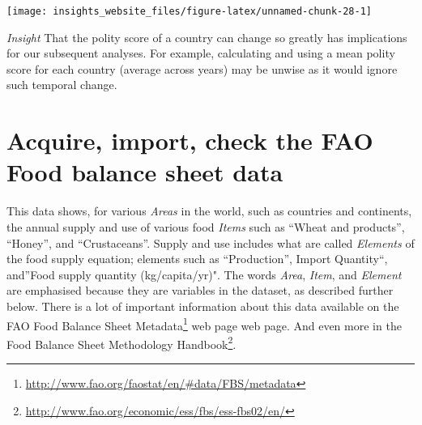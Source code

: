 \documentclass[]{book}
\newenvironment{Shaded}{\begin{snugshade}}{\end{snugshade}}
\newcommand{\DataTypeTok}[1]{\textcolor[rgb]{0.13,0.29,0.53}{#1}}
\newcommand{\KeywordTok}[1]{\textcolor[rgb]{0.13,0.29,0.53}{\textbf{#1}}}
\newcommand{\NormalTok}[1]{#1}
\newcommand{\OperatorTok}[1]{\textcolor[rgb]{0.81,0.36,0.00}{\textbf{#1}}}
\newcommand{\StringTok}[1]{\textcolor[rgb]{0.31,0.60,0.02}{#1}}
\renewcommand{\href}[2]{#2\footnote{\url{#1}}}
\begin{document}
\begin{Shaded}
\end{Shaded}

\begin{center}\texttt{[image: insights\_website\_files/figure-latex/unnamed-chunk-28-1]} \end{center}

\emph{Insight} That the polity score of a country can change so greatly has implications for our subsequent analyses. For example, calculating and using a mean polity score for each country (average across years) may be unwise as it would ignore such temporal change.

\hypertarget{acquire-import-check-the-fao-food-balance-sheet-data}{%
\section{Acquire, import, check the FAO Food balance sheet data}\label{acquire-import-check-the-fao-food-balance-sheet-data}}

This data shows, for various \emph{Areas} in the world, such as countries and continents, the annual supply and use of various food \emph{Items} such as ``Wheat and products'', ``Honey'', and ``Crustaceans''. Supply and use includes what are called \emph{Elements} of the food supply equation; elements such as ``Production'', Import Quantity``, and''Food supply quantity (kg/capita/yr)". The words \emph{Area}, \emph{Item}, and \emph{Element} are emphasised because they are variables in the dataset, as described further below. There is a lot of important information about this data available on the \href{http://www.fao.org/faostat/en/\#data/FBS/metadata}{FAO Food Balance Sheet Metadata} web page web page. And even more in the \href{http://www.fao.org/economic/ess/fbs/ess-fbs02/en/}{Food Balance Sheet Methodology Handbook}.
\end{document}
